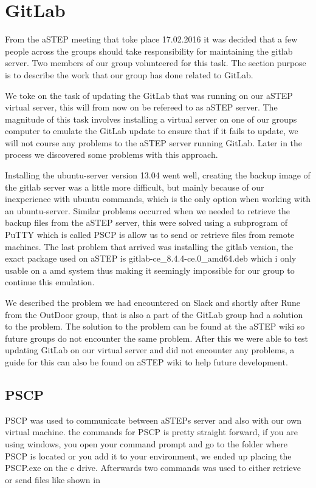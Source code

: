 \section{GitLab}
From the aSTEP meeting that toke place 17.02.2016 it was decided that a few people across the groups should take responsibility for maintaining the gitlab server. Two members of our group volunteered for this task. The section purpose is to describe the work that our group has done related to GitLab.

We toke on the task of updating the GitLab that was running on our aSTEP virtual server, this will from now on be refereed to as aSTEP server. The magnitude of this task involves installing a virtual server on one of our groups computer to emulate the GitLab update to ensure that if it fails to update, we will not course any problems to the aSTEP server running GitLab. Later in the process we discovered some problems with this approach.

Installing the ubuntu-server version 13.04 went well, creating the backup image of the gitlab server was a little more difficult, but mainly because of our inexperience with ubuntu commands, which is the only option when working with an ubuntu-server. Similar problems occurred when we needed to retrieve the backup files from the aSTEP server, this were solved using a subprogram of PuTTY which is called PSCP is allow us to send or retrieve files from remote machines. The last problem that arrived was installing the gitlab version, the exact package used on aSTEP is gitlab-ce\_8.4.4-ce.0\_amd64.deb which i only usable on a amd system thus making it seemingly impossible for our group to continue this emulation.  

We described the problem we had encountered on Slack and shortly after Rune from the OutDoor group, that is also a part of the GitLab group had a solution to the problem. The solution to the problem can be found at the aSTEP wiki so future groups do not encounter the same problem. After this we were able to test updating GitLab on our virtual server and did not encounter any problems, a guide for this can also be found on aSTEP wiki to help future development.

\subsection{PSCP}
PSCP was used to communicate between aSTEPs server and also with our own virtual machine. the commands for PSCP is pretty straight forward, if you are using windows, you open your command prompt and go to the folder where PSCP is located or you add it to your environment, we ended up placing the PSCP.exe on the c drive. Afterwards two commands was used to either retrieve or send files like shown in 

